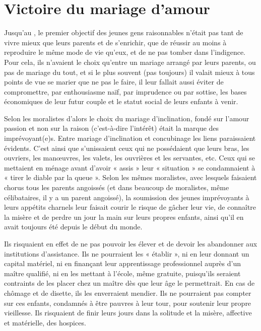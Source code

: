 
\chapter{Victoire du mariage d'amour}


 Jusqu'au , le premier objectif des jeunes gens raisonnables n'était pas tant de vivre mieux que leurs parents et de s'enrichir, que de réussir au moins à reproduire le même mode de vie qu'eux, et de ne pas tomber dans l'indigence. Pour cela, ils n'avaient le choix qu'entre un mariage arrangé par leurs parents, ou pas de mariage du tout, et si le plus souvent (pas toujours) il valait mieux à tous points de vue se marier que ne pas le faire, il leur fallait aussi éviter de compromettre, par enthousiasme naïf, par imprudence ou par sottise, les bases économiques de leur futur couple et le statut social de leurs enfants à venir. 

 Selon les moralistes d'alors le choix du mariage d'inclination, fondé sur l'amour passion et non sur la raison (c'est-à-dire l'intérêt) était la marque des imprévoyant(e)s. Entre mariage d'inclination et concubinage les liens paraissaient évidents. C'est ainsi que s'unissaient ceux qui ne possédaient que leurs bras, les ouvriers, les manœuvres, les valets, les ouvrières et les servantes, etc. Ceux qui se mettaient en ménage avant d'avoir « assis » leur « situation » se condamnaient à « tirer le diable par la queue ». Selon les mêmes moralistes, avec lesquels faisaient chorus tous les parents angoissés (et dans beaucoup de moralistes, même célibataires, il y a un parent angoissé), la soumission des jeunes imprévoyants à leurs appétits charnels leur faisait courir le risque de gâcher leur vie, de connaître la misère et de perdre un jour la main sur leurs propres enfants, ainsi qu'il en avait toujours été depuis le début du monde. 

 Ils risquaient en effet de ne pas pouvoir les élever et de devoir les abandonner aux institutions d'assistance. Ils ne pourraient les « établir », ni en leur donnant un capital matériel, ni en finançant leur apprentissage professionnel auprès d'un maître qualifié, ni en les mettant à l'école, même gratuite, puisqu'ils seraient contraints de les placer chez un maître dès que leur âge le permettrait. En cas de chômage et de disette, ils les enverraient mendier. Ils ne pourraient pas compter sur ces enfants, condamnés à être pauvres à leur tour, pour soutenir leur propre vieillesse. Ils risquaient de finir leurs jours dans la solitude et la misère, affective et matérielle, des hospices.

